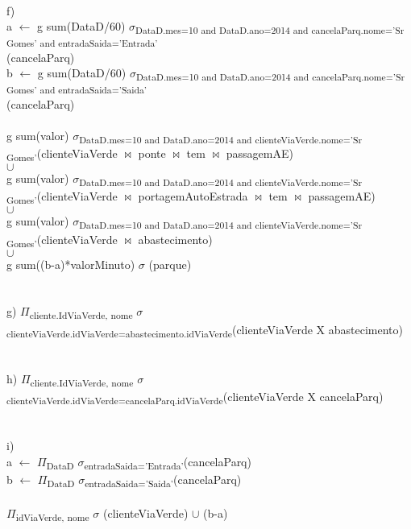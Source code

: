 \documentclass[a4paper]{article}
\begin{document}
\\
\newpage
\noindent f)\\
a $\leftarrow$ g sum(DataD/60) $\sigma$\textsubscript{DataD.mes=10 and DataD.ano=2014 and cancelaParq.nome='Sr Gomes' and entradaSaida='Entrada'}\\(cancelaParq)\\
b $\leftarrow$ g sum(DataD/60) $\sigma$\textsubscript{DataD.mes=10 and DataD.ano=2014 and cancelaParq.nome='Sr Gomes' and entradaSaida='Saida'}\\(cancelaParq)\\
\\
g sum(valor) $\sigma$\textsubscript{DataD.mes=10 and DataD.ano=2014 and clienteViaVerde.nome='Sr Gomes'}(clienteViaVerde $\bowtie$ ponte $\bowtie$ tem $\bowtie$ passagemAE)\\ $\cup$\\ g sum(valor) $\sigma$\textsubscript{DataD.mes=10 and DataD.ano=2014 and clienteViaVerde.nome='Sr Gomes'}(clienteViaVerde $\bowtie$ portagemAutoEstrada $\bowtie$ tem $\bowtie$ passagemAE)\\ $\cup$\\ g sum(valor) $\sigma$\textsubscript{DataD.mes=10 and DataD.ano=2014 and clienteViaVerde.nome='Sr Gomes'}(clienteViaVerde $\bowtie$ abastecimento)\\ $\cup$\\ g sum((b-a)*valorMinuto) $\sigma$ (parque)\\
\\
\\
\noindent g)
\indent $\Pi$\textsubscript{cliente.IdViaVerde, nome} $\sigma$\textsubscript{clienteViaVerde.idViaVerde=abastecimento.idViaVerde}(clienteViaVerde X abastecimento)\\
\\
\\
\noindent h)
\indent $\Pi$\textsubscript{cliente.IdViaVerde, nome} $\sigma$\textsubscript{clienteViaVerde.idViaVerde=cancelaParq.idViaVerde}(clienteViaVerde X cancelaParq)\\
\\
\\
\noindent i)\\
a $\leftarrow$ $\Pi$\textsubscript{DataD} $\sigma$\textsubscript{entradaSaida='Entrada'}(cancelaParq)\\
b $\leftarrow$ $\Pi$\textsubscript{DataD} $\sigma$\textsubscript{entradaSaida='Saida'}(cancelaParq)\\
\\
$\Pi$\textsubscript{idViaVerde, nome} $\sigma$ (clienteViaVerde) $\cup$ (b-a)\\
\end{document}
